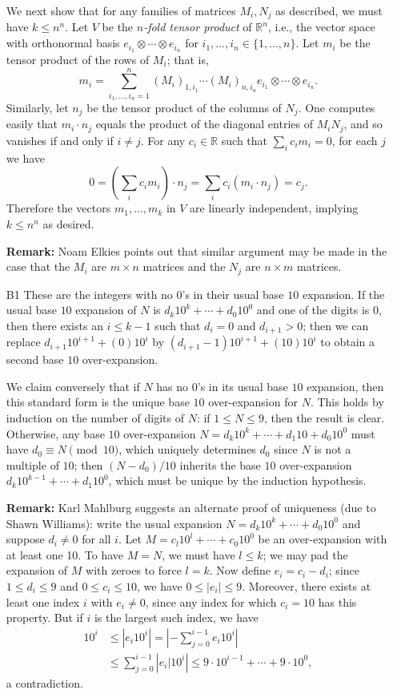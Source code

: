 \documentclass[amssymb,twocolumn,pra,10pt,aps]{revtex4-1}
\newcommand{\RR}{\mathbb{R}}
\begin{document}
\begin{itemize}
We next show that for any families of matrices $M_i, N_j$ as described, we must have $k \leq n^n$.
Let $V$ be the \emph{$n$-fold tensor product} of $\RR^n$, i.e., the vector space with  orthonormal basis
$e_{i_1} \otimes \cdots \otimes e_{i_n}$ for $i_1,\dots,i_n \in \{1,\dots,n\}$.
Let $m_i$ be the tensor product of the rows of $M_i$; that is,
\[
m_i = \sum_{i_1,\dots,i_n=1}^n (M_i)_{1,i_1} \cdots (M_i)_{n,i_n} e_{i_1} \otimes \cdots \otimes e_{i_n}.
\]
Similarly, let $n_j$ be the tensor product of the columns of $N_j$. One computes easily that $m_i \cdot n_j$ equals the product of the diagonal entries of $M_i N_j$,
and so vanishes if and only if $i \neq j$. For any $c_i \in \RR$ such that $\sum_i c_i m_i = 0$, for each $j$ we have 
\[
0 = \left(\sum_i c_i m_i\right) \cdot n_j = \sum_i c_i (m_i \cdot n_j) = c_j.
\]
Therefore the vectors $m_1,\dots,m_k$ in $V$ are linearly independent, implying $k \leq n^n$ as desired.

\noindent
\textbf{Remark:}
Noam Elkies points out that similar argument may be made in the case that the $M_i$ are $m \times n$ matrices and the $N_j$ are $n \times m$ matrices.

\item[B1]
These are the integers with no $0$'s in their usual base $10$ expansion. If the usual base $10$ expansion of $N$ is $d_k 10^k + \cdots + d_0 10^0$ and one of the digits is $0$, then there exists an $i \leq k-1$ such that $d_i = 0$ and $d_{i+1} > 0$; then we can replace $d_{i+1} 10^{i+1} + (0) 10^i$ by $(d_{i+1}-1) 10^{i+1} + (10) 10^i$ to obtain a second base $10$ over-expansion.

We claim conversely that if $N$ has no $0$'s in its usual base $10$ expansion, then this standard form is the unique base $10$ over-expansion for $N$. This holds by induction on the number of digits of $N$: if $1\leq N\leq 9$, then the result is clear. Otherwise, any base $10$ over-expansion $N = d_k 10^k + \cdots + d_1 10 + d_0 10^0$ must have $d_0 \equiv N \pmod{10}$, which uniquely determines $d_0$ since $N$ is not a multiple of $10$; then $(N-d_0)/10$ inherits the base $10$ over-expansion $d_k 10^{k-1} + \cdots + d_1 10^0$, which must be unique by the induction hypothesis.

\noindent
\textbf{Remark:}
Karl Mahlburg suggests an alternate proof of uniqueness (due to Shawn Williams):
write the usual expansion $N = d_k 10^k + \cdots + d_0 10^0$ and suppose $d_i \neq 0$ for all $i$. Let $M = c_l 10^l + \cdots + c_0 10^0$ be an over-expansion with at least one 10. To have $M = N$, we must have $l \leq k$; we may pad the expansion of $M$ with zeroes to force $l=k$. Now define $e_i = c_i - d_i$; since $1 \leq d_i \leq 9$ and $0 \leq c_i \leq 10$,
we have $0 \leq |e_i| \leq 9$. Moreover, there exists at least one index $i$ with $e_i \neq 0$, since any index for which $c_i = 10$ has this property. But if $i$ is the largest such index, we have 
\begin{align*}
10^i &\leq \left| e_i 10^i \right| = \left| -\sum_{j=0}^{i-1} e_i 10^i \right| \\
&\leq \sum_{j=0}^{i-1} \left| e_i| 10^i \right| \leq 9 \cdot 10^{i-1} + \cdots + 9 \cdot 10^0,
\end{align*}
a contradiction.


\end{itemize}
\end{document}
